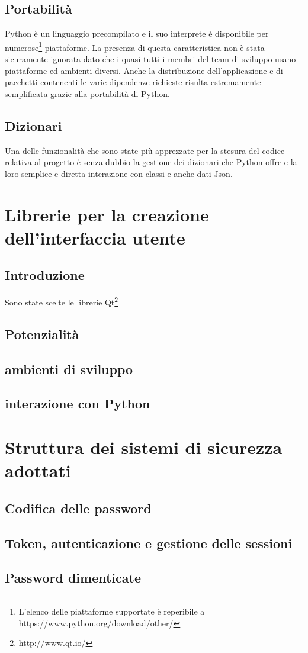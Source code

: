 \documentclass[12pt]{scrartcl}
\begin{document}
\subsection{Portabilit\`a}
Python \`e un linguaggio precompilato e il suo interprete \`e disponibile per
numerose\footnote{L'elenco delle piattaforme supportate \`e reperibile a https://www.python.org/download/other/} piattaforme. 
La presenza di questa caratteristica non \`e stata sicuramente
ignorata dato che i quasi tutti i membri del team di sviluppo usano piattaforme ed ambienti
diversi. Anche la distribuzione dell'applicazione e di pacchetti contenenti le 
varie dipendenze richieste risulta estremamente semplificata grazie alla portabilit\`a di Python.


\subsection{Dizionari}
Una delle funzionalit\`a che sono state pi\`u apprezzate per la stesura del codice
relativa al progetto \`e senza dubbio la gestione dei dizionari che Python offre
e la loro semplice e diretta interazione con classi e anche dati Json.


\section{Librerie per la creazione dell'interfaccia utente}
\subsection{Introduzione}
Sono state scelte le librerie Qt\footnote{http://www.qt.io/}
\subsection{Potenzialit\`a}
\subsection{ambienti di sviluppo}
\subsection{interazione con Python}

\section{Struttura dei sistemi di sicurezza adottati}
\subsection{Codifica delle password}
\subsection{Token, autenticazione e gestione delle sessioni}
\subsection{Password dimenticate}

\begin{thebibliography}{10}	


\end{thebibliography}
\end{document}
